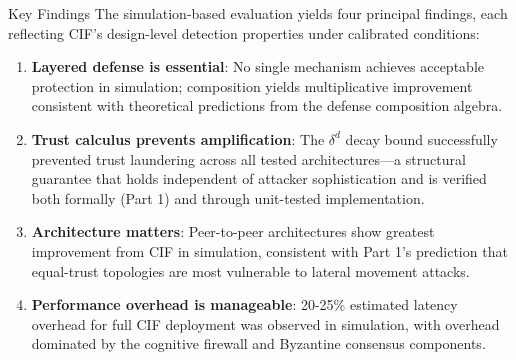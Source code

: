 \documentclass[
  ignorenonframetext,
]{beamer}
\begin{document}
\begin{frame}{Key Findings}
\protect{}\label{key-findings}
The simulation-based evaluation yields four principal findings, each
reflecting CIF's design-level detection properties under calibrated
conditions:

\begin{enumerate}
\item
  \textbf{Layered defense is essential}: No single mechanism achieves
  acceptable protection in simulation; composition yields multiplicative
  improvement consistent with theoretical predictions from the defense
  composition algebra.
\item
  \textbf{Trust calculus prevents amplification}: The \(\delta^d\) decay
  bound successfully prevented trust laundering across all tested
  architectures---a structural guarantee that holds independent of
  attacker sophistication and is verified both formally (Part 1) and
  through unit-tested implementation.
\item
  \textbf{Architecture matters}: Peer-to-peer architectures show
  greatest improvement from CIF in simulation, consistent with Part 1's
  prediction that equal-trust topologies are most vulnerable to lateral
  movement attacks.
\item
  \textbf{Performance overhead is manageable}: 20-25\% estimated latency
  overhead for full CIF deployment was observed in simulation, with
  overhead dominated by the cognitive firewall and Byzantine consensus
  components.
\end{enumerate}
\end{frame}
\end{document}
